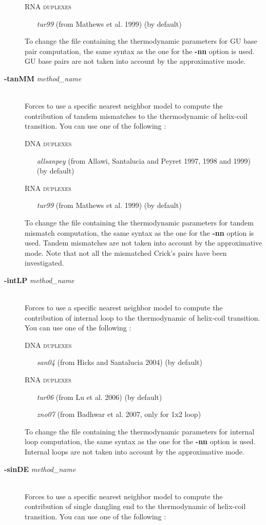 \documentclass{article}
\begin{document}
\begin{description}
  \textsc{RNA duplexes}
    \begin{itemize}
    \item [\textit{tur99}] (from Mathews et al. 1999) (by default)		 		 
    \end{itemize}
  To change the file containing the thermodynamic parameters for GU base pair computation, the same syntax as the one for the \textbf{-nn} option is used.
  GU base pairs are not taken into account by the approximative mode.
\item [\textbf{-tanMM} \textit{method\_name}]\mbox{}\\ 
  Forces to use a specific nearest neighbor model to compute the contribution of tandem mismatches to the thermodynamic of helix-coil transition. 
  You can use one of the following :
  
  \textsc{DNA duplexes}
    \begin{itemize}
    \item [\textit{allsanpey}] (from Allawi, Santalucia and Peyret 1997, 1998 and 1999)  (by default) 
    \end{itemize}
  \textsc{RNA duplexes}
    \begin{itemize}
    \item [\textit{tur99}] (from Mathews et al. 1999) (by default)		 		 
    \end{itemize}
  To change the file containing the thermodynamic parameters for tandem mismatch computation, the same syntax as the one for the \textbf{-nn} option is used.
  Tandem mismatches are not taken into account by the approximative mode. Note that not all the mismatched Crick's pairs have been investigated. 
\item [\textbf{-intLP} \textit{method\_name}]\mbox{}\\ 
  Forces to use a specific nearest neighbor model to compute the contribution of internal loop to the thermodynamic of helix-coil transition. 
  You can use one of the following :
  
  \textsc{DNA duplexes}
    \begin{itemize}
    \item [\textit{san04}] (from Hicks and Santalucia 2004)  (by default) 
    \end{itemize}
  \textsc{RNA duplexes}
    \begin{itemize}
    \item [\textit{tur06}] (from Lu et al. 2006) (by default)
    \item [\textit{zno07}] (from Badhwar et al. 2007, only for 1x2 loop)  
    \end{itemize}
  To change the file containing the thermodynamic parameters for internal loop computation, the same syntax as the one for the \textbf{-nn} option is used.
  Internal loops are not taken into account by the approximative mode.   
\item [\textbf{-sinDE} \textit{method\_name}]\mbox{}\\ 
  Forces to use a specific nearest neighbor model to compute the contribution of single dangling end to the thermodynamic of helix-coil transition. 
  You can use one of the following :
  

\end{description}
\end{document}
